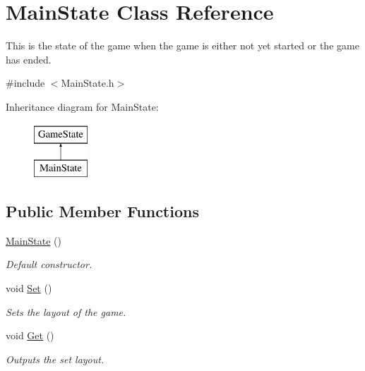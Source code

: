 \hypertarget{classMainState}{\section{Main\-State Class Reference}
\label{classMainState}
}


This is the state of the game when the game is either not yet started or the game has ended.  




{\ttfamily \#include $<$Main\-State.\-h$>$}

Inheritance diagram for Main\-State\-:\begin{figure}[H]
\begin{center}
\leavevmode
\includegraphics[height=2.000000cm]{classMainState}
\end{center}
\end{figure}
\subsection*{Public Member Functions}
\begin{DoxyCompactItemize}
\item 
\hypertarget{classMainState_afc29557ba046813d1bff4aea2501b7f1}{\hyperlink{classMainState_afc29557ba046813d1bff4aea2501b7f1}{Main\-State} ()}\label{classMainState_afc29557ba046813d1bff4aea2501b7f1}

\begin{DoxyCompactList}\small\item\em Default constructor. \end{DoxyCompactList}\item 
\hypertarget{classMainState_ac01eced9d617c8c8f5382a9aa96adb45}{void \hyperlink{classMainState_ac01eced9d617c8c8f5382a9aa96adb45}{Set} ()}\label{classMainState_ac01eced9d617c8c8f5382a9aa96adb45}

\begin{DoxyCompactList}\small\item\em Sets the layout of the game. \end{DoxyCompactList}\item 
\hypertarget{classMainState_a23233e859905d025cfc031a12977a844}{void \hyperlink{classMainState_a23233e859905d025cfc031a12977a844}{Get} ()}\label{classMainState_a23233e859905d025cfc031a12977a844}

\begin{DoxyCompactList}\small\item\em Outputs the set layout. \end{DoxyCompactList}\end{DoxyCompactItemize}
